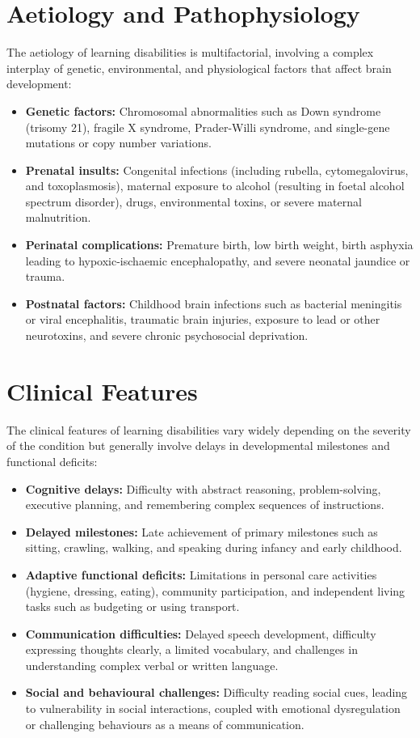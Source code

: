 \section*{Aetiology and Pathophysiology}
The aetiology of learning disabilities is multifactorial, involving a complex interplay of genetic, environmental, and physiological factors that affect brain development:
\begin{itemize}
    \item \textbf{Genetic factors:} Chromosomal abnormalities such as Down syndrome (trisomy 21), fragile X syndrome, Prader-Willi syndrome, and single-gene mutations or copy number variations.
    \item \textbf{Prenatal insults:} Congenital infections (including rubella, cytomegalovirus, and toxoplasmosis), maternal exposure to alcohol (resulting in foetal alcohol spectrum disorder), drugs, environmental toxins, or severe maternal malnutrition.
    \item \textbf{Perinatal complications:} Premature birth, low birth weight, birth asphyxia leading to hypoxic-ischaemic encephalopathy, and severe neonatal jaundice or trauma.
    \item \textbf{Postnatal factors:} Childhood brain infections such as bacterial meningitis or viral encephalitis, traumatic brain injuries, exposure to lead or other neurotoxins, and severe chronic psychosocial deprivation.
\end{itemize}

\section*{Clinical Features}
The clinical features of learning disabilities vary widely depending on the severity of the condition but generally involve delays in developmental milestones and functional deficits:
\begin{itemize}
    \item \textbf{Cognitive delays:} Difficulty with abstract reasoning, problem-solving, executive planning, and remembering complex sequences of instructions.
    \item \textbf{Delayed milestones:} Late achievement of primary milestones such as sitting, crawling, walking, and speaking during infancy and early childhood.
    \item \textbf{Adaptive functional deficits:} Limitations in personal care activities (hygiene, dressing, eating), community participation, and independent living tasks such as budgeting or using transport.
    \item \textbf{Communication difficulties:} Delayed speech development, difficulty expressing thoughts clearly, a limited vocabulary, and challenges in understanding complex verbal or written language.
    \item \textbf{Social and behavioural challenges:} Difficulty reading social cues, leading to vulnerability in social interactions, coupled with emotional dysregulation or challenging behaviours as a means of communication.
\end{itemize}


